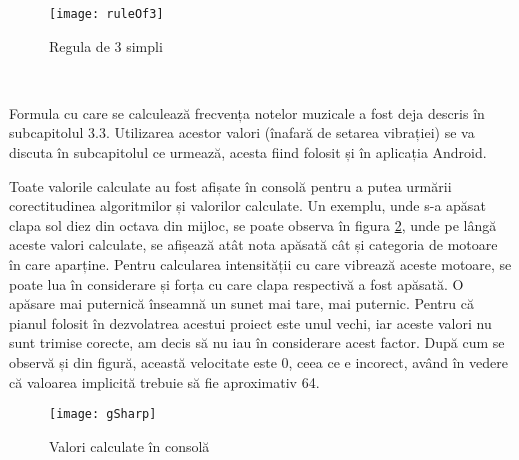 \documentclass[../IoMusT.tex]{subfiles}
\begin{document}
\begin{figure}[h]
\centering
\texttt{[image: ruleOf3]}
\caption{Regula de 3 simpli}
\label{fig:ruleOf3}
\end{figure}  
\\
\par Formula cu care se calculează frecvența notelor muzicale a fost deja descris în subcapitolul 3.3. Utilizarea acestor valori (înafară de setarea vibrației) se va discuta în subcapitolul ce urmează, acesta fiind folosit și în aplicația Android.
\\
\par Toate valorile calculate au fost afișate în consolă pentru a putea urmării corectitudinea algoritmilor și valorilor calculate. Un exemplu, unde s-a apăsat clapa sol diez din octava din mijloc, se poate observa în figura \ref{fig:gSharp}, unde pe lângă aceste valori calculate, se afișează atât nota apăsată cât și categoria de motoare în care aparține. Pentru calcularea intensității cu care vibrează aceste motoare, se poate lua în considerare și forța cu care clapa respectivă a fost apăsată. O apăsare mai puternică înseamnă un sunet mai tare, mai puternic. Pentru că pianul folosit în dezvolatrea acestui proiect este unul vechi, iar aceste valori nu sunt trimise corecte, am decis să nu iau în considerare acest factor. După cum se observă și din figură, această velocitate este 0, ceea ce e incorect, având în vedere că valoarea implicită trebuie să fie aproximativ 64.
\begin{figure}[h]
\centering
\texttt{[image: gSharp]}
\caption{Valori calculate în consolă}
\label{fig:gSharp}
\end{figure}  
\end{document}
